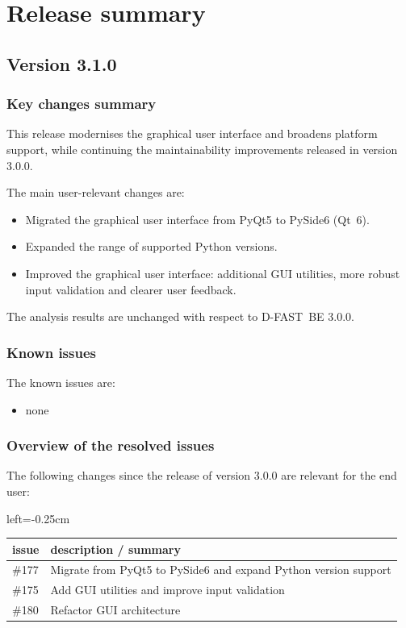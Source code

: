 \documentclass[git]{deltares_manual}
\newcommand{\dfbe}{\textrm{D-FAST~BE}\xspace}
\begin{document}
\chapter{Release summary}

\section{Version 3.1.0}

\subsection{Key changes summary}
This release modernises the graphical user interface and broadens platform support, while continuing the maintainability improvements released in version 3.0.0.

The main user-relevant changes are:
\begin{itemize}
	\item Migrated the graphical user interface from PyQt5 to PySide6 (Qt~6).
	\item Expanded the range of supported Python versions.
	\item Improved the graphical user interface: additional GUI utilities, more robust input validation and clearer user feedback.
\end{itemize}

The analysis results are unchanged with respect to \dfbe 3.0.0.

\subsection{Known issues}

The known issues are:

\begin{itemize}
	\item none
\end{itemize}

\subsection{Overview of the resolved issues}

The following changes since the release of version 3.0.0 are relevant for the end user:

\begin{adjustbox}{left=-0.25cm}
	\begin{tabular}{ l l }
		issue & description / summary\\ \hline
		\#177 & Migrate from PyQt5 to PySide6 and expand Python version support \\
		\#175 & Add GUI utilities and improve input validation \\
		\#180 & Refactor GUI architecture \\
	\end{tabular}
\end{adjustbox}
\end{document}
